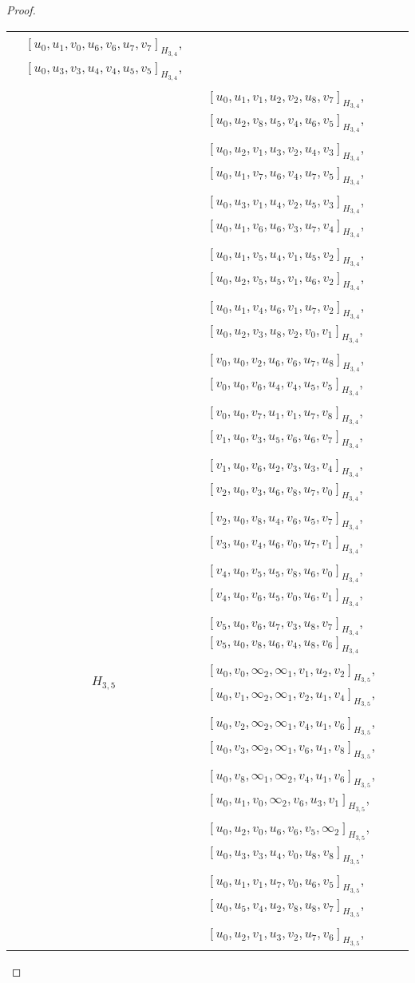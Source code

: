 \begin{subappendices}
\begin{proof}
{\begin{longtable}{|c|l|}
  $[u_0, u_1, v_0, u_6, v_6, u_7, v_7]_{H_{3,4}}$,
  $[u_0, u_3, v_3, u_4, v_4, u_5, v_5]_{H_{3,4}}$, \\* &
  $[u_0, u_1, v_1, u_2, v_2, u_8, v_7]_{H_{3,4}}$,
  $[u_0, u_2, v_8, u_5, v_4, u_6, v_5]_{H_{3,4}}$, \\* &
  $[u_0, u_2, v_1, u_3, v_2, u_4, v_3]_{H_{3,4}}$,
  $[u_0, u_1, v_7, u_6, v_4, u_7, v_5]_{H_{3,4}}$, \\* &
  $[u_0, u_3, v_1, u_4, v_2, u_5, v_3]_{H_{3,4}}$,
  $[u_0, u_1, v_6, u_6, v_3, u_7, v_4]_{H_{3,4}}$, \\* &
  $[u_0, u_1, v_5, u_4, v_1, u_5, v_2]_{H_{3,4}}$,
  $[u_0, u_2, v_5, u_5, v_1, u_6, v_2]_{H_{3,4}}$, \\* &
  $[u_0, u_1, v_4, u_6, v_1, u_7, v_2]_{H_{3,4}}$,
  $[u_0, u_2, v_3, u_8, v_2, v_0, v_1]_{H_{3,4}}$, \\* &
  $[v_0, u_0, v_2, u_6, v_6, u_7, u_8]_{H_{3,4}}$,
  $[v_0, u_0, v_6, u_4, v_4, u_5, v_5]_{H_{3,4}}$, \\* &
  $[v_0, u_0, v_7, u_1, v_1, u_7, v_8]_{H_{3,4}}$,
  $[v_1, u_0, v_3, u_5, v_6, u_6, v_7]_{H_{3,4}}$, \\* &
  $[v_1, u_0, v_6, u_2, v_3, u_3, v_4]_{H_{3,4}}$,
  $[v_2, u_0, v_3, u_6, v_8, u_7, v_0]_{H_{3,4}}$, \\* &
  $[v_2, u_0, v_8, u_4, v_6, u_5, v_7]_{H_{3,4}}$,
  $[v_3, u_0, v_4, u_6, v_0, u_7, v_1]_{H_{3,4}}$, \\* &
  $[v_4, u_0, v_5, u_5, v_8, u_6, v_0]_{H_{3,4}}$,
  $[v_4, u_0, v_6, u_5, v_0, u_6, v_1]_{H_{3,4}}$, \\* &
  $[v_5, u_0, v_6, u_7, v_3, u_8, v_7]_{H_{3,4}}$,
  $[v_5, u_0, v_8, u_6, v_4, u_8, v_6]_{H_{3,4}}$
\\ \hline
$H_{3,5}$ &
  $[u_0, v_0, \infty_2, \infty_1, v_1, u_2, v_2]_{H_{3,5}}$,
  $[u_0, v_1, \infty_2, \infty_1, v_2, u_1, v_4]_{H_{3,5}}$, \\* &
  $[u_0, v_2, \infty_2, \infty_1, v_4, u_1, v_6]_{H_{3,5}}$,
  $[u_0, v_3, \infty_2, \infty_1, v_6, u_1, v_8]_{H_{3,5}}$, \\* &
  $[u_0, v_8, \infty_1, \infty_2, v_4, u_1, v_6]_{H_{3,5}}$,
  $[u_0, u_1, v_0, \infty_2, v_6, u_3, v_1]_{H_{3,5}}$, \\* &
  $[u_0, u_2, v_0, u_6, v_6, v_5, \infty_2]_{H_{3,5}}$,
  $[u_0, u_3, v_3, u_4, v_0, u_8, v_8]_{H_{3,5}}$, \\* &
  $[u_0, u_1, v_1, u_7, v_0, u_6, v_5]_{H_{3,5}}$,
  $[u_0, u_5, v_4, u_2, v_8, u_8, v_7]_{H_{3,5}}$, \\* &
  $[u_0, u_2, v_1, u_3, v_2, u_7, v_6]_{H_{3,5}}$,

\end{longtable}}
\end{proof}
\end{subappendices}
